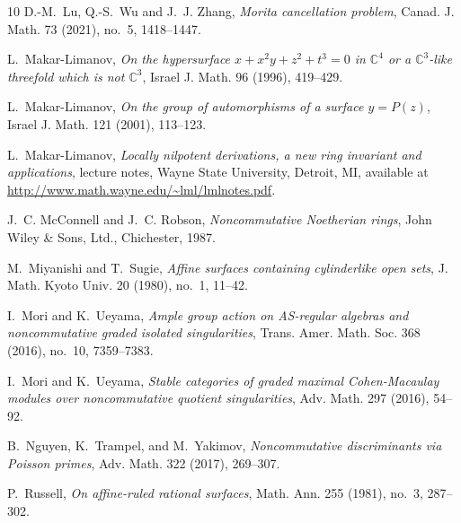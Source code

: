 \documentclass{amsart}
\theoremstyle{plain}
\numberwithin{theorem}{section}
\numberwithin{equation}{theorem}
\theoremstyle{definition}
\begin{document}
\begin{thebibliography}{10}
D.-M.~Lu, Q.-S.~Wu and J.~J. Zhang,
\emph{Morita cancellation problem},
Canad. J. Math. 73 (2021), no.~5, 1418--1447.


L.~Makar-Limanov,
\emph{On the hypersurface $x+x^{2}y+z^{2}+t^{3}=0$ in $\mathbb{C}^{4}$ or a $\mathbb{C}^{3}$-like threefold which is not $\mathbb{C}^{3}$},
Israel J. Math. 96 (1996), 419--429.



L.~Makar-Limanov,
\emph{On the group of automorphisms of a surface $y=P(z)$},
Israel J. Math. 121 (2001), 113--123.

L.~Makar-Limanov,
\emph{Locally nilpotent derivations, a new ring invariant and applications},
lecture notes, Wayne State University, Detroit, MI, available at \url{http://www.math.wayne.edu/~lml/lmlnotes.pdf}.


J.~C. McConnell and J.~C. Robson,
\emph{Noncommutative Noetherian rings},
John Wiley \& Sons, Ltd., Chichester, 1987.

M.~Miyanishi and T.~Sugie,
\emph{Affine surfaces containing cylinderlike open sets},
J. Math. Kyoto Univ. 20 (1980), no.~1, 11--42.

I.~Mori and K.~Ueyama,
\emph{Ample group action on AS-regular algebras and noncommutative graded isolated singularities},
Trans. Amer. Math. Soc. 368 (2016), no.~10, 7359--7383.

I.~Mori and K.~Ueyama,
\emph{Stable categories of graded maximal Cohen-Macaulay modules over noncommutative quotient singularities},
Adv. Math. 297 (2016), 54--92.

B.~Nguyen, K.~Trampel, and M.~Yakimov,
\emph{Noncommutative discriminants via Poisson primes},
Adv. Math. 322 (2017), 269--307.


P.~Russell,
\emph{On affine-ruled rational surfaces},
Math. Ann. 255 (1981), no.~3, 287--302.




\end{thebibliography}
\end{document}
